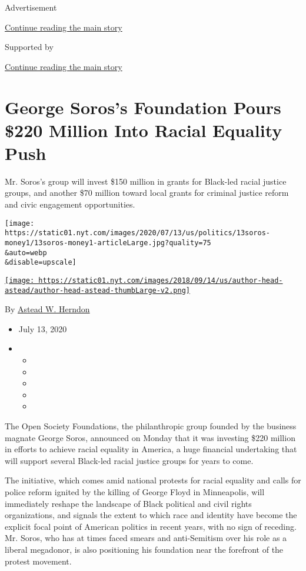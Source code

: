Advertisement

\protect\hyperlink{after-top}{Continue reading the main story}

Supported by

\protect\hyperlink{after-sponsor}{Continue reading the main story}

\hypertarget{george-soross-foundation-pours-220-million-into-racial-equality-push}{%
\section{George Soros's Foundation Pours \$220 Million Into Racial
Equality
Push}\label{george-soross-foundation-pours-220-million-into-racial-equality-push}}

Mr. Soros's group will invest \$150 million in grants for Black-led
racial justice groups, and another \$70 million toward local grants for
criminal justice reform and civic engagement opportunities.

\texttt{[image: https://static01.nyt.com/images/2020/07/13/us/politics/13soros-money1/13soros-money1-articleLarge.jpg?quality=75\\\&auto=webp\\\&disable=upscale]}

\href{https://www.nytimes.com/by/astead-w-herndon}{\texttt{[image: https://static01.nyt.com/images/2018/09/14/us/author-head-astead/author-head-astead-thumbLarge-v2.png]}}

By \href{https://www.nytimes.com/by/astead-w-herndon}{Astead W. Herndon}

\begin{itemize}
\item
  July 13, 2020
\item
  \begin{itemize}
  \item
  \item
  \item
  \item
  \item
  \end{itemize}
\end{itemize}

The Open Society Foundations, the philanthropic group founded by the
business magnate George Soros, announced on Monday that it was investing
\$220 million in efforts to achieve racial equality in America, a huge
financial undertaking that will support several Black-led racial justice
groups for years to come.

The initiative, which comes amid national protests for racial equality
and calls for police reform ignited by the killing of George Floyd in
Minneapolis, will immediately reshape the landscape of Black political
and civil rights organizations, and signals the extent to which race and
identity have become the explicit focal point of American politics in
recent years, with no sign of receding. Mr. Soros, who has at times
faced smears and anti-Semitism over his role as a liberal megadonor, is
also positioning his foundation near the forefront of the protest
movement.

